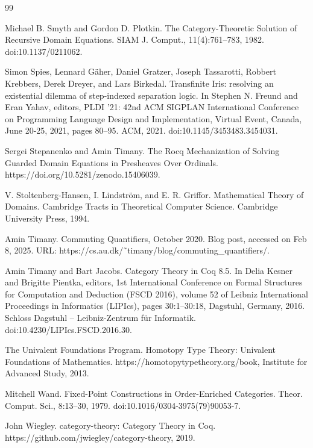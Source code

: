 \begin{thebibliography}{99}
\par\noindent    Michael B. Smyth and Gordon D. Plotkin.  The Category-Theoretic Solution of Recursive Domain Equations.  SIAM J. Comput., 11(4):761–783, 1982.  doi:10.1137/0211062.  

\par\noindent    Simon Spies, Lennard Gäher, Daniel Gratzer, Joseph Tassarotti, Robbert Krebbers, Derek Dreyer, and Lars Birkedal.  Transfinite Iris: resolving an existential dilemma of step-indexed separation logic.  In Stephen N. Freund and Eran Yahav, editors, PLDI ’21: 42nd ACM SIGPLAN International Conference on Programming Language Design and Implementation, Virtual Event, Canada, June 20-25, 2021, pages 80–95. ACM, 2021.  doi:10.1145/3453483.3454031.  

\par\noindent    Sergei Stepanenko and Amin Timany.  The Rocq Mechanization of Solving Guarded Domain Equations in Presheaves Over Ordinals.  https://doi.org/10.5281/zenodo.15406039.  

\par\noindent    V. Stoltenberg-Hansen, I. Lindström, and E. R. Griffor.  Mathematical Theory of Domains.  Cambridge Tracts in Theoretical Computer Science. Cambridge University Press, 1994.  

\par\noindent    Amin Timany.  Commuting Quantifiers, October 2020.  Blog post, accessed on Feb 8, 2025.  URL: https://cs.au.dk/˜timany/blog/commuting\_quantifiers/.  

\par\noindent    Amin Timany and Bart Jacobs.  Category Theory in Coq 8.5.  In Delia Kesner and Brigitte Pientka, editors, 1st International Conference on Formal Structures for Computation and Deduction (FSCD 2016), volume 52 of Leibniz International Proceedings in Informatics (LIPIcs), pages 30:1–30:18, Dagstuhl, Germany, 2016. Schloss Dagstuhl – Leibniz-Zentrum für Informatik.  doi:10.4230/LIPIcs.FSCD.2016.30.  

\par\noindent    The Univalent Foundations Program.  Homotopy Type Theory: Univalent Foundations of Mathematics.  https://homotopytypetheory.org/book, Institute for Advanced Study, 2013.  

\par\noindent    Mitchell Wand.  Fixed-Point Constructions in Order-Enriched Categories.  Theor. Comput. Sci., 8:13–30, 1979.  doi:10.1016/0304-3975(79)90053-7.  

\par\noindent    John Wiegley.  category-theory: Category Theory in Coq.  https://github.com/jwiegley/category-theory, 2019.  

\end{thebibliography}
